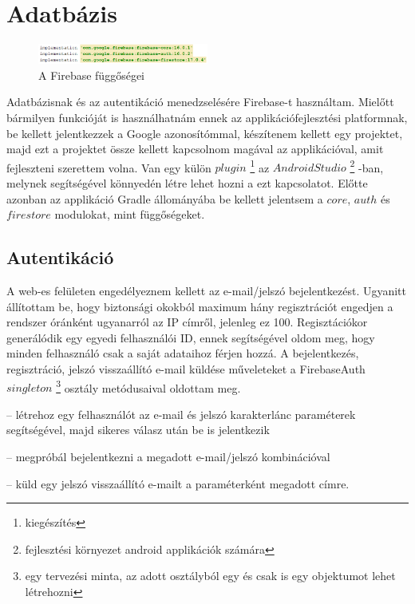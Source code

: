 \section{Adatbázis}\label{sec:ALAP:adatelem}

 \begin{figure}
	\centering
	\setlength{\abovecaptionskip}{0pt}
	\setlength{\belowcaptionskip}{0pt}
	\includegraphics[width=0.5\textwidth]{images/firebase_gradle}
	\caption{A Firebase függőségei\label{fig:ALAP:sm2}}
\end{figure}

Adatbázisnak és az autentikáció menedzselésére Firebase-t használtam. Mielőtt bármilyen funkcióját is használhatnám ennek az applikációfejlesztési platformnak, be kellett jelentkezzek a Google azonosítómmal, készítenem kellett egy projektet, majd ezt a projektet össze kellett kapcsolnom magával az applikációval, amit fejleszteni szerettem volna. Van egy külön \(plugin\)%
\footnote{ %
	kiegészítés
}  %
 az \(Android Studio\)%
 \footnote{ %
 	fejlesztési környezet android applikációk számára
 }  %
-ban, melynek segítségével könnyedén létre lehet hozni a ezt kapcsolatot. Előtte azonban az applikáció Gradle állományába be kellett jelentsem a \(core\), \(auth\) és \(firestore\) modulokat, mint függőségeket.
 

 

\subsection{Autentikáció}

A web-es felületen engedélyeznem kellett az e-mail/jelszó bejelentkezést. Ugyanitt állítottam be, hogy biztonsági okokból maximum hány regisztrációt engedjen a rendszer óránként ugyanarról az IP címről, jelenleg ez 100. Regisztációkor generálódik egy egyedi felhasználói ID, ennek segítségével oldom meg, hogy minden felhasználó csak a saját adataihoz férjen hozzá. A bejelentkezés, regisztráció, jelszó visszaállító e-mail küldése műveleteket a FirebaseAuth \(singleton\)%
\footnote{ %
	egy tervezési minta, az adott osztályból egy és csak is egy objektumot lehet létrehozni
}  %
 osztály metódusaival oldottam meg.
 
 \begin{description}
 	\setlength{\itemsep}{0.04mm}
 	\item[createUserWithEmailAndPassword(email, jelszó)] -- létrehoz egy felhasználót az e-mail és jelszó karakterlánc paraméterek segítségével, majd sikeres válasz után be is jelentkezik
 	\item[signInWithEmailAndPassword(email, jelszó)] -- megpróbál bejelentkezni a megadott e-mail/jelszó kombinációval
 	\item[sendPasswordResetEmail(email)] -- küld egy jelszó visszaállító e-mailt a paraméterként megadott címre.
 \end{description}

